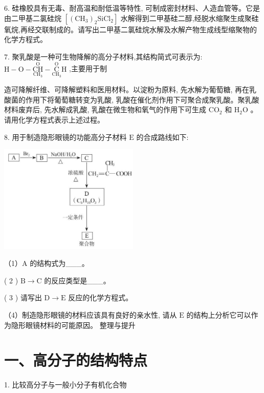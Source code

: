 \documentclass[10pt]{article}
\begin{document}
6. 硅橡胶具有无毒、耐高温和耐低温等特性, 可制成密封材料、人造血管等。它是由二甲基二氯硅烷 \(\left\lbrack {{\left( {\mathrm{{CH}}}_{3}\right) }_{2}{\mathrm{{SiCl}}}_{2}}\right\rbrack\) 水解得到二甲基硅二醇,经脱水缩聚生成聚硅氧烷,再经交联制成的。请写出二甲基二氯硅烷水解及水解产物生成线型缩聚物的化学方程式。

7. 聚乳酸是一种可生物降解的高分子材料,其结构简式可表示为: \(\mathrm{H} - \mathrm{O} - \underset{{\mathrm{{CH}}}_{3}}{\overset{\mathrm{O}}{\mathrm{{CH}}}} - \underset{{\mathrm{{CH}}}_{3}}{\overset{\mathrm{O}}{\mathrm{C}}}\mathrm{H}\) ,主要用于制

造可降解纤维、可降解塑料和医用材料。以淀粉为原料, 先水解为葡萄糖, 再在乳酸菌的作用下将葡萄糖转变为乳酸, 乳酸在催化剂作用下可聚合成聚乳酸。聚乳酸材料废弃后, 先水解成乳酸, 乳酸在微生物和氧气的作用下可生成 \({\mathrm{{CO}}}_{2}\) 和 \({\mathrm{H}}_{2}\mathrm{O}\) 。请用化学方程式表示上述过程。

8. 用于制造隐形眼镜的功能高分子材料 \(\mathrm{E}\) 的合成路线如下:

\begin{center}
\includegraphics[max width=0.5\textwidth]{images/0190efc5-b58a-7c43-bfb0-e0a030df9cfd_156_786909.jpg}
\end{center}

（1）A 的结构式为\_\_\_。

( 2 ) \(\mathrm{B} \rightarrow \mathrm{C}\) 的反应类型是\_\_\_。

( 3 ) 请写出 \(\mathrm{D} \rightarrow \mathrm{E}\) 反应的化学方程式。

（4）制造隐形眼镜的材料应该具有良好的亲水性, 请从 \(\mathrm{E}\) 的结构上分析它可以作为隐形眼镜材料的可能原因。 整理与提升

\section*{一、高分子的结构特点}

1. 比较高分子与一般小分子有机化合物
\end{document}
